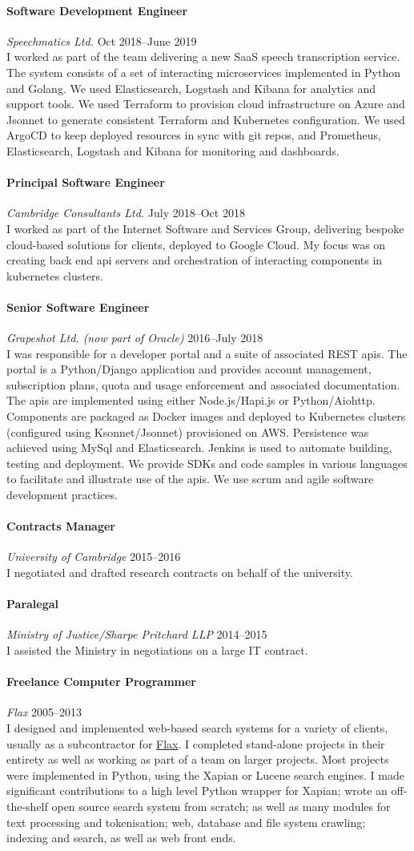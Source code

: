 \documentclass[11pt,a4paper]{article}
\newcommand{\centry}[3]{\paragraph{#1} \textit{#2}%
\hfill#3\\[2pt]}
\begin{document}
\centry{Software Development Engineer}{Speechmatics Ltd.}{Oct 2018--June 2019}

I worked as part of the team delivering a new SaaS speech transcription
service. The system consists of a set of interacting microservices implemented
in Python and Golang. We used Elasticsearch, Logstash and Kibana for analytics
and support tools. We used Terraform to provision cloud infrastructure on Azure
and Jsonnet to generate consistent Terraform and Kubernetes
configuration. We used ArgoCD to keep deployed resources in sync with
git repos, and Prometheus, Elasticsearch, Logstash and Kibana for
monitoring and dashboards.

\centry{Principal Software Engineer}{Cambridge Consultants Ltd.}{July 2018--Oct
2018}

I worked as part of the Internet Software and Services Group, delivering
bespoke cloud-based solutions for clients, deployed to Google Cloud. My focus
was on creating back end api servers and orchestration of interacting
components in kubernetes clusters.

\centry{Senior Software Engineer}{Grapeshot Ltd. (now part of
  Oracle)}{2016--July 2018}

I was responsible for a developer portal and a suite of associated
REST apis. The portal is a Python/Django application and provides
account management, subscription plans, quota and usage enforcement
and associated documentation. The apis are implemented using either
Node.js/Hapi.js or Python/Aiohttp. Components are packaged as Docker
images and deployed to Kubernetes clusters (configured using
Ksonnet/Jsonnet) provisioned on AWS. Persistence was achieved using
MySql and Elasticsearch. Jenkins is used to automate building, testing
and deployment. We provide SDKs and code samples in various languages
to facilitate and illustrate use of the apis. We use scrum and agile
software development practices.

\centry{Contracts Manager}{University of Cambridge}{2015--2016}
I negotiated and drafted research contracts on behalf of the university.

\centry{Paralegal}{Ministry of Justice/Sharpe Pritchard LLP}{2014--2015} I
assisted the Ministry in negotiations on a large IT contract.

\centry{Freelance Computer Programmer}{Flax}{2005--2013} I designed and
implemented web-based search systems for a variety of clients, usually as a
subcontractor for \href{http://www.flax.co.uk}{Flax}. I completed stand-alone
projects in their entirety as well as working as part of a team on larger
projects.  Most projects were implemented in Python, using the Xapian or Lucene
search engines. I made significant contributions to a high level Python wrapper
for Xapian; wrote an off-the-shelf open source search system from scratch; as
well as many modules for text processing and tokenisation; web, database and
file system crawling; indexing and search, as well as web front ends.
\end{document}
